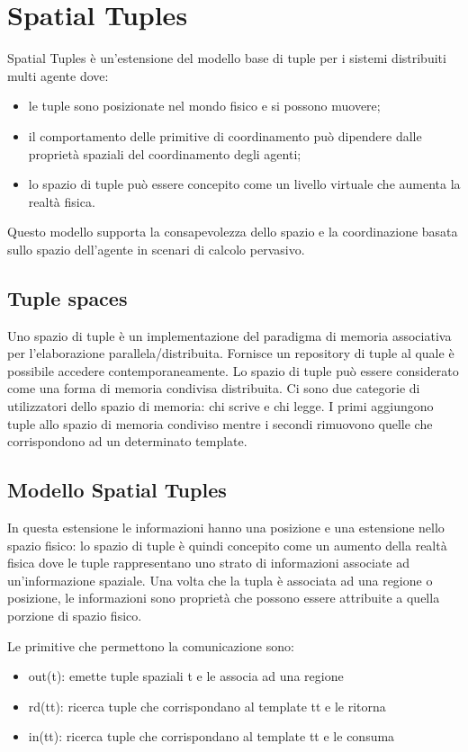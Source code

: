 \documentclass[12pt,a4paper,openright,twoside]{report}
\begin{document}
\chapter{Spatial Tuples}
Spatial Tuples \`e un'estensione del modello base di tuple per i sistemi distribuiti multi agente dove:
\begin{itemize}
   \item le tuple sono posizionate nel mondo fisico e si possono muovere;
   \item il comportamento delle primitive di coordinamento pu\`o dipendere dalle propriet\`a spaziali del coordinamento degli agenti;
   \item lo spazio di tuple pu\`o essere concepito come un livello virtuale che aumenta la realt\`a fisica.
\end{itemize}

Questo modello supporta la consapevolezza dello spazio e la coordinazione basata sullo spazio dell'agente in scenari di calcolo pervasivo.

\section{Tuple spaces}
Uno spazio di tuple \`e un implementazione del paradigma di memoria associativa per l'elaborazione parallela/distribuita. Fornisce un repository di tuple al quale \`e possibile accedere contemporaneamente. Lo spazio di tuple pu\`o essere considerato come una forma di memoria condivisa distribuita. Ci sono due categorie di utilizzatori dello spazio di memoria: chi scrive e chi legge. I primi aggiungono tuple allo spazio di memoria condiviso mentre i secondi rimuovono quelle che corrispondono ad un determinato template.

\section{Modello Spatial Tuples}\label{ModelloSpatialTuples}
In questa estensione le informazioni hanno una posizione e una estensione nello spazio fisico: lo spazio di tuple \`e quindi concepito come un aumento della realt\`a fisica dove le tuple rappresentano uno strato di informazioni associate ad un'informazione spaziale.
Una volta che la tupla \`e associata ad una regione o posizione, le informazioni sono propriet\`a che possono essere attribuite a quella porzione di spazio fisico.

Le primitive che permettono la comunicazione sono:
\begin{itemize}
   \item out(t): emette tuple spaziali t e le associa ad una regione
   \item rd(tt): ricerca tuple che corrispondano al template tt e le ritorna
   \item in(tt): ricerca tuple che corrispondano al template tt e le consuma
\end{itemize}
\end{document}
